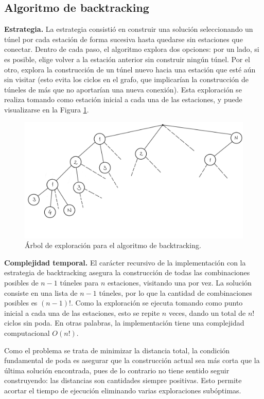 \documentclass[10 pt, A4paper]{article}
\begin{document}
	\subsection*{Algoritmo de backtracking}

	\textbf{Estrategia.} La estrategia consistió en construir una solución seleccionando un túnel por cada estación de forma sucesiva hasta quedarse sin estaciones que conectar. Dentro de cada paso, el algoritmo explora dos opciones: por un lado, si es posible, elige volver a la estación anterior sin construir ningún túnel. Por el otro, explora la construcción de un túnel nuevo hacia una estación que esté aún sin visitar (esto evita los ciclos en el grafo, que implicarían la construcción de túneles de más que no aportarían una nueva conexión). Esta exploración se realiza tomando como estación inicial a cada una de las estaciones, y puede visualizarse en la Figura \ref{tree}.
	
	\begin{figure}
		\centering
		\includegraphics[scale = 0.18]{Árbol de exploración.png}
		\caption{Árbol de exploración para el algoritmo de backtracking.}
		\label{tree}
	\end{figure}
	
	\textbf{Complejidad temporal.} El carácter recursivo de la implementación con la estrategia de backtracking asegura la construcción de todas las combinaciones posibles de $n-1$ túneles para $n$ estaciones, visitando una por vez. La solución consiste en una lista de $n-1$ túneles, por lo que la cantidad de combinaciones posibles es $(n-1)!$. Como la exploración se ejecuta tomando como punto inicial a cada una de las estaciones, esto se repite $n$ veces, dando un total de $n!$ ciclos sin poda. En otras palabras, la implementación tiene una complejidad computacional $O(n!)$.
	
	Como el problema se trata de minimizar la distancia total, la condición fundamental de poda es asegurar que la construcción actual sea más corta que la última solución encontrada, pues de lo contrario no tiene sentido seguir construyendo: las distancias son cantidades siempre positivas. Esto permite acortar el tiempo de ejecución eliminando varias exploraciones subóptimas.
	
\end{document}
